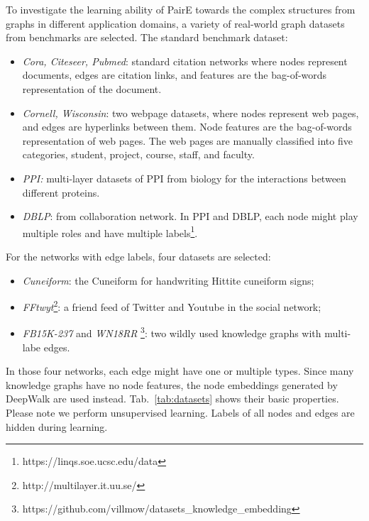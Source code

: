 \documentclass[10pt,journal,compsoc]{IEEEtran}
\begin{document}
To investigate the learning ability of PairE towards the complex structures from graphs in different application domains, a variety of real-world graph datasets from benchmarks are selected. The standard benchmark dataset:
\begin{itemize}
  

  \item \textit{Cora, Citeseer, Pubmed}: standard citation networks where nodes represent documents, edges are citation links, and features are the bag-of-words representation of the document. 
  \item \textit{Cornell, Wisconsin}: two webpage datasets, where nodes represent web pages, and edges are hyperlinks between them. Node features are the bag-of-words representation of web pages. The web pages are manually classified into five categories, student, project, course, staff, and faculty. 
  \item \textit{PPI:} multi-layer datasets of PPI from biology for the interactions between different proteins. \item \textit{DBLP}: from collaboration network. In PPI and DBLP, each node might play multiple roles and have multiple labels\footnote{https://linqs.soe.ucsc.edu/data}. 
  \end{itemize}
For the networks with edge labels, four datasets are selected: 
  \begin{itemize}
  \item \textit{Cuneiform}: the Cuneiform for handwriting Hittite cuneiform signs; 
 \item \textit{FFtwyt}\footnote{http://multilayer.it.uu.se/}: a friend feed of Twitter and Youtube in the social network;
 \item \textit{FB15K-237} and \textit{WN18RR} \footnote{https://github.com/villmow/datasets\_knowledge\_embedding}: two wildly used knowledge graphs with  multi-labe edges.
 \end{itemize}

In those four networks, each edge might have one or multiple types. Since many knowledge graphs have no node features, the node embeddings generated by DeepWalk are used instead. Tab.~\ref{tab:datasets} shows their basic properties. Please note we perform unsupervised learning. Labels of all nodes and edges are hidden during learning.
\end{document}
